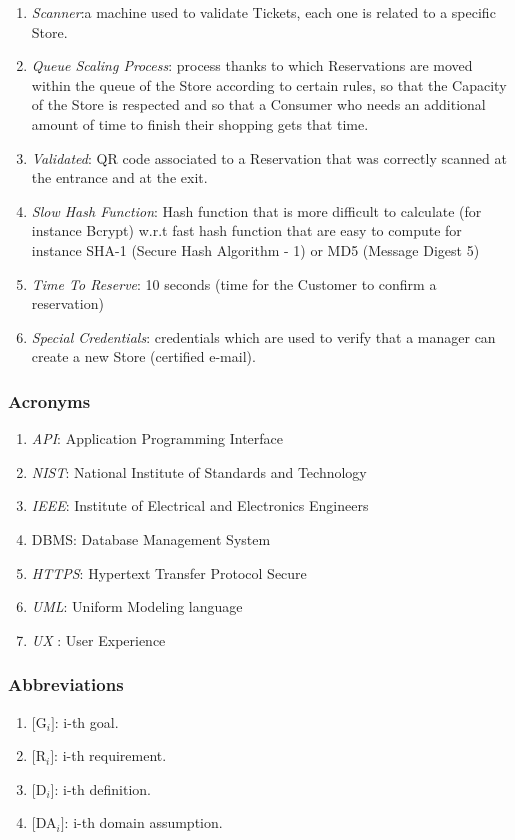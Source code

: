 \documentclass[a4paper, 12pt, oneside]{article}
\begin{document}
\begin{enumerate}[label={D.\arabic{*}}]
\item \label{def:scanner}\textit{Scanner}:a machine used to validate Tickets, each one is related to a specific Store.
\item \label{def:queuescaling}\textit{Queue Scaling Process}: process thanks to which Reservations are moved within the queue of the Store according to certain rules, so that the Capacity of the Store is respected and so that a Consumer who needs an additional amount of time to finish their shopping gets that time.
\item \label{def:validated}\textit{Validated}: QR code associated to a Reservation that was correctly scanned at the entrance and at the exit.
\item \label{def:slowHashFunction}\textit{Slow Hash Function}: Hash function that is more difficult to calculate (for instance Bcrypt) w.r.t fast hash function that are easy to compute for instance SHA-1 (Secure Hash Algorithm - 1) or MD5 (Message Digest 5)
\item \label{def:timeToReserve}\textit{Time To Reserve}: 10 seconds (time for the Customer to confirm a reservation)
\item \label{def:specialCredentials} \textit{Special Credentials}: credentials which are used to verify that a manager can create a new Store (certified e-mail).
\end{enumerate}

\subsubsection{Acronyms}
\begin{enumerate}[label={A.\arabic{*}}]
\item \label{def:API}\textit{API}: Application Programming Interface
\item \label{def:NIST}\textit{NIST}: National Institute of Standards and Technology
\item \label{def:IEEE}\textit{IEEE}: Institute of Electrical and Electronics Engineers
\item \label{def:DBMS} DBMS: Database Management System
\item \label{def:HTTPS}\textit{HTTPS}: Hypertext Transfer Protocol Secure
\item \label{def:UML}\textit{UML}: Uniform Modeling language
\item \label{def:UX}\textit{UX} : User Experience
\end{enumerate}

\subsubsection{Abbreviations}
\begin{enumerate}[label={AB.\arabic{*}}]
\item $[$G$_i]$: i-th goal.
\item $[$R$_i]$: i-th requirement.
\item $[$D$_i]$: i-th definition.
\item $[$DA$_i]$: i-th domain assumption.
\end{enumerate}
\end{document}
